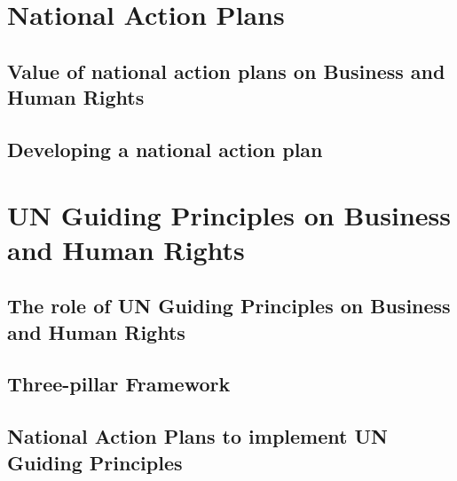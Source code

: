\documentclass[draft=false
              ,paper=a4
              ,twoside=false
              ,fontsize=12pt
              ,headsepline
              ,BCOR10mm
              ,DIV11
              ]{scrbook}
\begin{document}
\vspace{12pt}
\chapter{National Action Plans}
\vspace{6pt}
\section{Value of national action plans on Business and Human Rights}
\vspace{6pt}

\vspace{12pt}
\section{Developing a national action plan }
\vspace{6pt}






\vspace{12pt}
\chapter{UN Guiding Principles on Business and Human Rights}
\vspace{6pt}
\section{The role of UN Guiding Principles on Business and Human Rights}
\vspace{6pt}

\vspace{12pt}
\section{Three-pillar Framework}
\vspace{6pt}

\vspace{12pt}
\section{National Action Plans to implement UN Guiding Principles}
\vspace{6pt}






\vspace{12pt}
\end{document}
